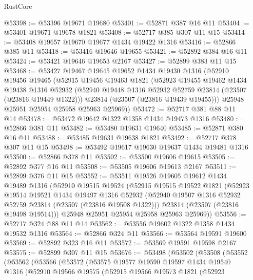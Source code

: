 \begin{lexlean}{RustCore}
\begin{coremodule}
@53398 := @53396 @19671 @19680
@53401 := @52871 @387 @16 @11
@53404 := @53401 @19671 @19678 @1821
@53408 := @52717 @385 @307 @11 @15
@53414 := @53408 @19657 @19670 @19677 @1434 @19422 @1316
@53416 := @52866 @385 @11
@53418 := @53416 @19646 @19655
@53421 := @52892 @384 @16 @11
@53424 := @53421 @19646 @19653 @2167
@53427 := @52899 @383 @11 @15
@53468 := @53427
    @19467
    @19645
    @19652
    @1434
    @19430
    @1316
    (@52910
      @19456
      @19465
      (@52915
        @19456
        @19463
        @1821
        (@52923
          @19455
          @19462
          @1434
          @19438
          @1316
          @52932
          (@52940 @19448 @1316 @52932 @52759 @23814 (@23507 (@23816 @19449 @1322)))
          @23814
          (@23507 (@23816 @19439 @19455)))
        @25948
        @25951
        @25954
        @25958
        @25963
        @25969))
@53472 := @52717 @381 @88 @11 @14
@53478 := @53472 @19642 @1322 @1358 @1434 @19473 @1316
@53480 := @52866 @381 @11
@53482 := @53480 @19631 @19640
@53485 := @52871 @380 @16 @11
@53488 := @53485 @19631 @19638 @1821
@53492 := @52717 @378 @307 @11 @15
@53498 := @53492 @19617 @19630 @19637 @1434 @19481 @1316
@53500 := @52866 @378 @11
@53502 := @53500 @19606 @19615
@53505 := @52892 @377 @16 @11
@53508 := @53505 @19606 @19613 @2167
@53511 := @52899 @376 @11 @15
@53552 := @53511
    @19526
    @19605
    @19612
    @1434
    @19489
    @1316
    (@52910
      @19515
      @19524
      (@52915
        @19515
        @19522
        @1821
        (@52923
          @19514
          @19521
          @1434
          @19497
          @1316
          @52932
          (@52940 @19507 @1316 @52932 @52759 @23814 (@23507 (@23816 @19508 @1322)))
          @23814
          (@23507 (@23816 @19498 @19514)))
        @25948
        @25951
        @25954
        @25958
        @25963
        @25969))
@53556 := @52717 @324 @88 @11 @14
@53562 := @53556 @19602 @1322 @1358 @1434 @19532 @1316
@53564 := @52866 @324 @11
@53566 := @53564 @19591 @19600
@53569 := @52892 @323 @16 @11
@53572 := @53569 @19591 @19598 @2167
@53575 := @52899 @307 @11 @15
@53676 := @53498
    (@53502
      (@53508
        (@53552
          (@53562
            (@53566
              (@53572
                (@53575
                  @19577
                  @19590
                  @19597
                  @1434
                  @19540
                  @1316
                  (@52910
                    @19566
                    @19575
                    (@52915
                      @19566
                      @19573
                      @1821
                      (@52923

\end{coremodule}
\end{lexlean}
